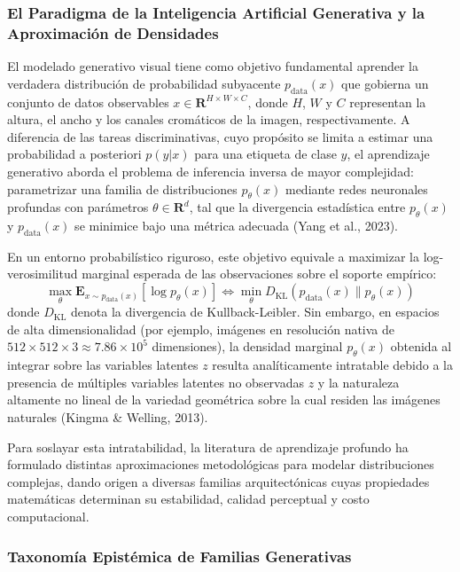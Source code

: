 \subsubsection{El Paradigma de la Inteligencia Artificial Generativa y la Aproximación de Densidades}

El modelado generativo visual tiene como objetivo fundamental aprender la verdadera distribución de probabilidad subyacente $p_{\mathrm{data}}(x)$ que gobierna un conjunto de datos observables $x \in \mathbf{R}^{H \times W \times C}$, donde $H$, $W$ y $C$ representan la altura, el ancho y los canales cromáticos de la imagen, respectivamente. A diferencia de las tareas discriminativas, cuyo propósito se limita a estimar una probabilidad a posteriori $p(y|x)$ para una etiqueta de clase $y$, el aprendizaje generativo aborda el problema de inferencia inversa de mayor complejidad: parametrizar una familia de distribuciones $p_\theta(x)$ mediante redes neuronales profundas con parámetros $\theta \in \mathbf{R}^d$, tal que la divergencia estadística entre $p_\theta(x)$ y $p_{\mathrm{data}}(x)$ se minimice bajo una métrica adecuada (Yang et al., 2023).

En un entorno probabilístico riguroso, este objetivo equivale a maximizar la log-verosimilitud marginal esperada de las observaciones sobre el soporte empírico:
\begin{equation}
\max_\theta \mathbf{E}_{x \sim p_{\mathrm{data}}(x)} \left[ \log p_\theta(x) \right] \iff \min_\theta D_{\mathrm{KL}}(p_{\mathrm{data}}(x) \parallel p_\theta(x))
\end{equation}
donde $D_{\mathrm{KL}}$ denota la divergencia de Kullback-Leibler. Sin embargo, en espacios de alta dimensionalidad (por ejemplo, imágenes en resolución nativa de $512 \times 512 \times 3 \approx 7.86 \times 10^5$ dimensiones), la densidad marginal $p_\theta(x)$ obtenida al integrar sobre las variables latentes $z$ resulta analíticamente intratable debido a la presencia de múltiples variables latentes no observadas $z$ y la naturaleza altamente no lineal de la variedad geométrica sobre la cual residen las imágenes naturales (Kingma \& Welling, 2013).

Para soslayar esta intratabilidad, la literatura de aprendizaje profundo ha formulado distintas aproximaciones metodológicas para modelar distribuciones complejas, dando origen a diversas familias arquitectónicas cuyas propiedades matemáticas determinan su estabilidad, calidad perceptual y costo computacional.

\subsubsection{Taxonomía Epistémica de Familias Generativas}

